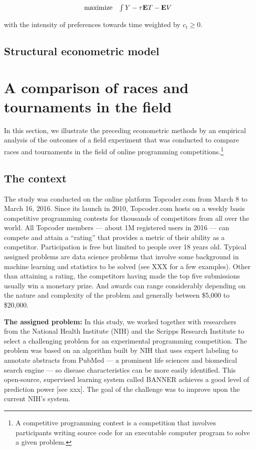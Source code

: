 \documentclass[12pt,]{article}
\begin{document}
\[\begin{array}{ll}
    \mbox{maximize} & \int {Y}   -  {\tau}{{\bf E}}{T} - {{\bf E}}{V}
  \end{array}\]

with the intensity of preferences towards time weighted by
\(c_t\geq 0\).

\subsection{Structural econometric
model}\label{structural-econometric-model}

\section{A comparison of races and tournaments in the
field}\label{a-comparison-of-races-and-tournaments-in-the-field}

In this section, we illustrate the preceding econometric methods by an
empirical analysis of the outcomes of a field experiment that was
conducted to compare races and tournaments in the field of online
programming competitions.\footnote{A competitive programming contest is
  a competition that involves participants writing source code for an
  executable computer program to solve a given problem.}

\subsection{The context}\label{the-context}

The study was conducted on the online platform Topcoder.com from March 8
to March 16, 2016. Since its launch in 2010, Topcoder.com hosts on a
weekly basis competitive programming contests for thousands of
competitors from all over the world. All Topcoder members --- about 1M
registered users in 2016 --- can compete and attain a ``rating'' that
provides a metric of their ability as a competitor. Participation is
free but limited to people over 18 years old. Typical assigned problems
are data science problems that involve some background in machine
learning and statistics to be solved (see XXX for a few examples). Other
than attaining a rating, the competitors having made the top five
submissions usually win a monetary prize. And awards can range
considerably depending on the nature and complexity of the problem and
generally between \$5,000 to \$20,000.

\textbf{The assigned problem:} In this study, we worked together with
researchers from the National Health Institute (NIH) and the Scripps
Research Institute to select a challenging problem for an experimental
programming competition. The problem was based on an algorithm built by
NIH that uses expert labeling to annotate abstracts from PubMed --- a
prominent life sciences and biomedical search engine --- so disease
characteristics can be more easily identified. This open-source,
supervised learning system called BANNER achieves a good level of
prediction power {{[}}see xxx{{]}}. The goal of the challenge was to
improve upon the current NIH's system.
\end{document}
